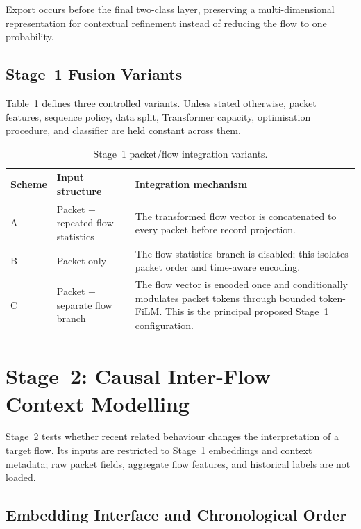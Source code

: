 \documentclass[11pt,fleqn]{report}
\begin{document}
Export occurs before the final two-class layer, preserving a multi-dimensional representation for contextual refinement instead of reducing the flow to one probability.

\subsection{Stage~1 Fusion Variants}
\label{subsubsec:stage1_variants}

Table~\ref{tab:stage1_fusion_variants} defines three controlled variants. Unless stated otherwise, packet features, sequence policy, data split, Transformer capacity, optimisation procedure, and classifier are held constant across them.

\begin{table}[H]
    \centering
    \caption{Stage~1 packet/flow integration variants.}
    \label{tab:stage1_fusion_variants}
    \small
    \begin{tabular}{@{}p{1.1cm}p{3.1cm}p{8.9cm}@{}}
        \toprule
        Scheme & Input structure & Integration mechanism \\
        \midrule
        A & Packet + repeated flow statistics & The transformed flow vector is concatenated to every packet before record projection. \\
        B & Packet only & The flow-statistics branch is disabled; this isolates packet order and time-aware encoding. \\
        C & Packet + separate flow branch & The flow vector is encoded once and conditionally modulates packet tokens through bounded token-FiLM. This is the principal proposed Stage~1 configuration. \\
        \bottomrule
    \end{tabular}
\end{table}

\section{Stage~2: Causal Inter-Flow Context Modelling}
\label{subsec:method_stage2}

Stage~2 tests whether recent related behaviour changes the interpretation of a target flow. Its inputs are restricted to Stage~1 embeddings and context metadata; raw packet fields, aggregate flow features, and historical labels are not loaded.

\subsection{Embedding Interface and Chronological Order}
\label{subsubsec:embedding_interface}
\end{document}
